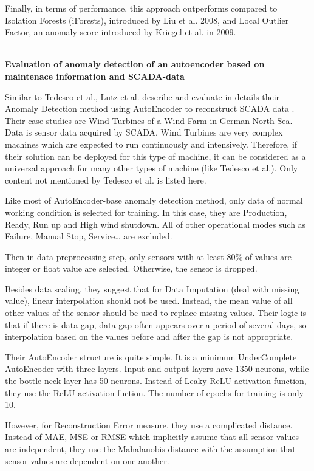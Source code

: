 Finally, in terms of performance, this approach outperforms compared to Isolation Forests (iForests), introduced by Liu et al. 2008, and Local Outlier Factor, an anomaly score introduced by Kriegel et al. in 2009.

\hspace{1cm}\\
\textbf{Evaluation of anomaly detection of an autoencoder based on maintenace information and SCADA-data} \parencite{lutz2020evaluation}

Similar to Tedesco et al., Lutz et al. describe and evaluate in details their Anomaly Detection method using AutoEncoder to reconstruct SCADA data \parencite{lutz2020evaluation}. Their case studies are Wind Turbines of a Wind Farm in German North Sea. Data is sensor data acquired by SCADA. Wind Turbines are very complex machines which are expected to run continuously and intensively. Therefore, if their solution can be deployed for this type of machine, it can be considered as a universal approach for many other types of machine (like Tedesco et al.). Only content not mentioned by Tedesco et al. is listed here.

Like most of AutoEncoder-base anomaly detection method, only data of normal working condition is selected for training. In this case, they are Production, Ready, Run up and High wind shutdown. All of other operational modes such as Failure, Manual Stop, Service… are excluded.

Then in data preprocessing step, only sensors with at least 80\% of values are integer or float value are selected. Otherwise, the sensor is dropped.

Besides data scaling, they suggest that for Data Imputation (deal with missing value), linear interpolation should not be used. Instead, the mean value of all other values of the sensor should be used to replace missing values. Their logic is that if there is data gap, data gap often appears over a period of several days, so interpolation based on the values before and after the gap is not appropriate.

Their AutoEncoder structure is quite simple. It is a minimum UnderComplete AutoEncoder with three layers. Input and output layers have 1350 neurons, while the bottle neck layer has 50 neurons. Instead of Leaky ReLU activation function, they use the ReLU activation fuction. The number of epochs for training is only 10.

However, for Reconstruction Error measure, they use a complicated distance. Instead of MAE, MSE or RMSE which implicitly assume that all sensor values are independent, they use the Mahalanobis distance with the assumption that sensor values are dependent on one another.

